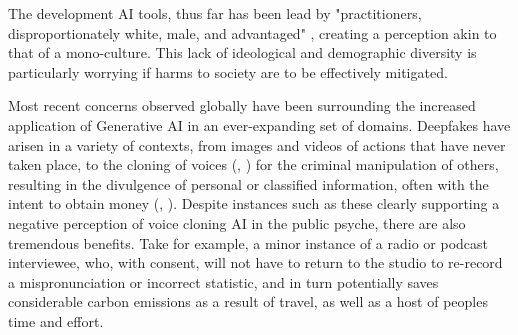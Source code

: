 The development AI tools, thus far has been lead by "practitioners, disproportionately white, male, and advantaged" \cite{lazarAISafetyWhose2023}, creating a perception akin to that of a mono-culture. This lack of ideological and demographic diversity is particularly worrying if harms to society are to be effectively mitigated.

Most recent concerns observed globally have been surrounding the increased application of Generative AI in an ever-expanding set of domains. Deepfakes have arisen in a variety of contexts, from images and videos of actions that have never taken place, to the cloning of voices (\cite{ElevenLabsGenerativeAI}, \cite{SpeechifyCompleteAI2022}) for the criminal manipulation of others, resulting in the divulgence of personal or classified information, often with the intent to obtain money (\cite{federaltradecommissionconsumeradviceScammersUseAI2023}, \cite{pashentsevPalgraveHandbookMalicious2023}). Despite instances such as these clearly supporting a negative perception of voice cloning AI in the public psyche, there are also tremendous benefits. Take for example, a minor instance of a radio or podcast interviewee, who, with consent, will not have to return to the studio to re-record a mispronunciation or incorrect statistic, and in turn potentially saves considerable carbon emissions as a result of travel, as well as a host of peoples time and effort. 

